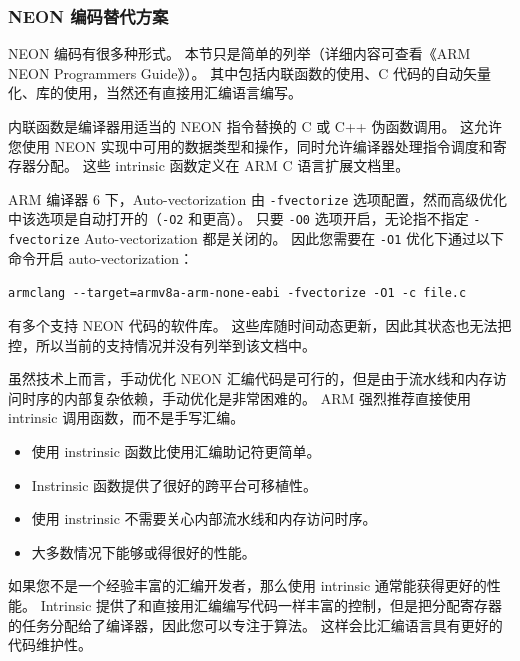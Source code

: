 \subsubsection{NEON 编码替代方案}

NEON 编码有很多种形式。
本节只是简单的列举（详细内容可查看《ARM NEON Programmers Guide》）。
其中包括内联函数的使用、C 代码的自动矢量化、库的使用，当然还有直接用汇编语言编写。

内联函数是编译器用适当的 NEON 指令替换的 C 或 C++ 伪函数调用。
这允许您使用 NEON 实现中可用的数据类型和操作，同时允许编译器处理指令调度和寄存器分配。
这些 intrinsic 函数定义在 ARM C 语言扩展文档里。

ARM 编译器 6 下，Auto-vectorization 由 \lstinline!-fvectorize! 选项配置，然而高级优化中该选项是自动打开的（\lstinline!-O2! 和更高）。
只要 \lstinline!-O0! 选项开启，无论指不指定 \lstinline!-fvectorize! Auto-vectorization 都是关闭的。
因此您需要在 \lstinline!-O1! 优化下通过以下命令开启 auto-vectorization：

\lstinline!armclang --target=armv8a-arm-none-eabi -fvectorize -O1 -c file.c!

有多个支持 NEON 代码的软件库。
这些库随时间动态更新，因此其状态也无法把控，所以当前的支持情况并没有列举到该文档中。

虽然技术上而言，手动优化 NEON 汇编代码是可行的，但是由于流水线和内存访问时序的内部复杂依赖，手动优化是非常困难的。
ARM 强烈推荐直接使用 intrinsic 调用函数，而不是手写汇编。

\begin{itemize}
  \item 使用 instrinsic 函数比使用汇编助记符更简单。
  \item Instrinsic 函数提供了很好的跨平台可移植性。
  \item 使用 instrinsic 不需要关心内部流水线和内存访问时序。
  \item 大多数情况下能够或得很好的性能。
\end{itemize}

如果您不是一个经验丰富的汇编开发者，那么使用 intrinsic 通常能获得更好的性能。
Intrinsic 提供了和直接用汇编编写代码一样丰富的控制，但是把分配寄存器的任务分配给了编译器，因此您可以专注于算法。
这样会比汇编语言具有更好的代码维护性。
